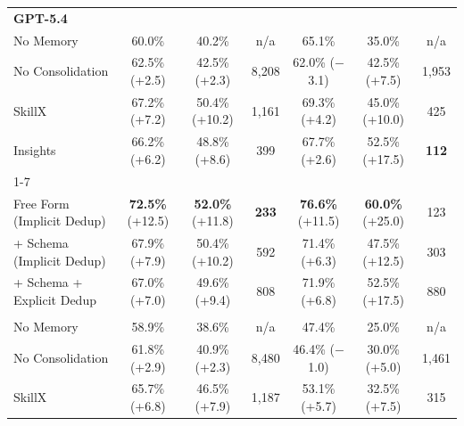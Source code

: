 \begin{table}[tb]
{\begin{tabular}{l ccc ccc}
\multicolumn{7}{l}{\textbf{GPT-5.4}} \\
No Memory          & 60.0\%                          & 40.2\%                          & n/a     & 65.1\%                          & 35.0\%                          & n/a     \\
No Consolidation   & 62.5\% {\scriptsize(+2.5)}      & 42.5\% {\scriptsize(+2.3)}      & 8{,}208 & 62.0\% {\scriptsize($-$3.1)}    & 42.5\% {\scriptsize(+7.5)}      & 1{,}953 \\
SkillX             & 67.2\% {\scriptsize(+7.2)}      & 50.4\% {\scriptsize(+10.2)}     & 1{,}161 & 69.3\% {\scriptsize(+4.2)}      & 45.0\% {\scriptsize(+10.0)}     & 425     \\
Insights           & 66.2\% {\scriptsize(+6.2)}      & 48.8\% {\scriptsize(+8.6)}      & 399     & 67.7\% {\scriptsize(+2.6)}      & 52.5\% {\scriptsize(+17.5)}     & \textbf{112} \\
\cmidrule(lr){1-7}
\multicolumn{7}{l}{\textit{WASP-Mem}} \\
\rowcolor{OurRow}
\quad Free Form (Implicit Dedup)             & \textbf{72.5\%} {\scriptsize(+12.5)} & \textbf{52.0\%} {\scriptsize(+11.8)} & \textbf{233} & \textbf{76.6\%} {\scriptsize(+11.5)} & \textbf{60.0\%} {\scriptsize(+25.0)} & 123          \\
\quad + Schema (Implicit Dedup)              & 67.9\% {\scriptsize(+7.9)}     & 50.4\% {\scriptsize(+10.2)}     & 592          & 71.4\% {\scriptsize(+6.3)}      & 47.5\% {\scriptsize(+12.5)}     & 303          \\
\quad + Schema + Explicit Dedup              & 67.0\% {\scriptsize(+7.0)}     & 49.6\% {\scriptsize(+9.4)}      & 808          & 71.9\% {\scriptsize(+6.8)}      & 52.5\% {\scriptsize(+17.5)}     & 880          \\
\midrule
\rowcolor{ModelRow}
\multicolumn{7}{l}{\textbf{GLM-5}} \\
No Memory          & 58.9\%                          & 38.6\%                          & n/a     & 47.4\%                          & 25.0\%                          & n/a     \\
No Consolidation   & 61.8\% {\scriptsize(+2.9)}      & 40.9\% {\scriptsize(+2.3)}      & 8{,}480 & 46.4\% {\scriptsize($-$1.0)}    & 30.0\% {\scriptsize(+5.0)}      & 1{,}461 \\
SkillX             & 65.7\% {\scriptsize(+6.8)}      & 46.5\% {\scriptsize(+7.9)}      & 1{,}187 & 53.1\% {\scriptsize(+5.7)}      & 32.5\% {\scriptsize(+7.5)}      & 315     \\

\end{tabular}}
\end{table}
